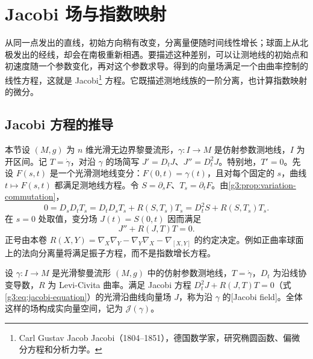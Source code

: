 
% 
% 

\section{Jacobi 场与指数映射}
\label{g3:sec:0602}

从同一点发出的直线，初始方向稍有改变，分离量便随时间线性增长；球面上从北极发出的经线，却会在南极重新相遇。要描述这种差别，可以让测地线的初始点和初速度随一个参数变化，再对这个参数求导。得到的向量场满足一个由曲率控制的线性方程，这就是 Jacobi\footnote{Carl Gustav Jacob Jacobi（1804--1851），德国数学家，研究椭圆函数、偏微分方程和分析力学。} 方程。它既描述测地线族的一阶分离，也计算指数映射的微分。

\subsection{Jacobi 方程的推导}
\label{g3:subsec:0602:01}

本节设 \((M,g)\) 为 \(n\) 维光滑无边界黎曼流形，\(\gamma:I\to M\) 是仿射参数测地线，\(I\) 为开区间。记 \(T=\dot\gamma\)，对沿 \(\gamma\) 的场简写 \(J'=D_tJ\)、\(J''=D_t^2J\)。特别地，\(T'=0\)。先设 \(F(s,t)\) 是一个光滑测地线变分：\(F(0,t)=\gamma(t)\)，且对每个固定的 \(s\)，曲线 \(t\mapsto F(s,t)\) 都满足测地线方程。令 \(S=\partial_sF\)、\(T_s=\partial_tF\)。由\cref{g3:prop:variation-commutation}，
\[
	0=D_sD_tT_s
	=D_tD_sT_s+R(S,T_s)T_s
	=D_t^2S+R(S,T_s)T_s.
\]
在 \(s=0\) 处取值，变分场 \(J(t)=S(0,t)\) 因而满足
\begin{equation}\label{g3:eq:jacobi-equation}
	J''+R(J,T)T=0.
\end{equation}
正号由本卷 \(R(X,Y)=\nabla_X\nabla_Y-\nabla_Y\nabla_X-\nabla_{[X,Y]}\) 的约定决定。例如正曲率球面上的法向分离量将满足振子方程，而不是指数增长方程。

\begin{definition}[Jacobi 场]\label{g3:def:jacobi-field}
	设 \(\gamma:I\to M\) 是光滑黎曼流形 \((M,g)\) 中的仿射参数测地线，\(T=\dot\gamma\)，\(D_t\) 为沿线协变导数，\(R\) 为 Levi-Civita 曲率。满足 Jacobi 方程 \(D_t^2J+R(J,T)T=0\)（式\eqref{g3:eq:jacobi-equation}）的光滑沿曲线向量场 \(J\)，称为沿 \(\gamma\) 的[Jacobi field]。全体这样的场构成实向量空间，记为 \(\mathcal J(\gamma)\)。
\end{definition}

